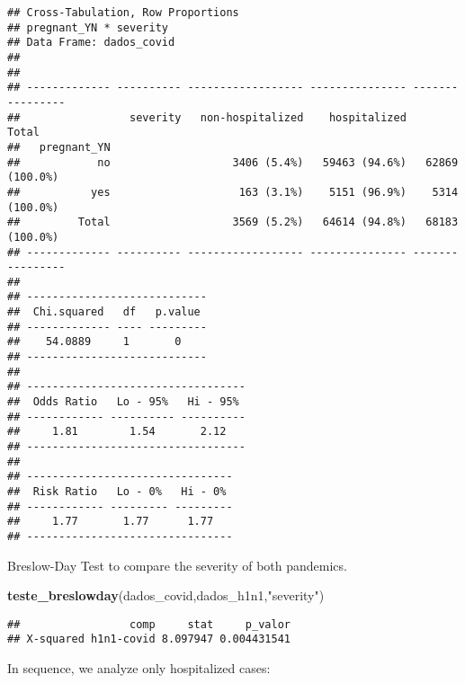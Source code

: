 \documentclass[
]{article}
\newenvironment{Shaded}{\begin{snugshade}}{\end{snugshade}}
\newcommand{\CommentTok}[1]{\textcolor[rgb]{0.56,0.35,0.01}{\textit{#1}}}
\newcommand{\KeywordTok}[1]{\textcolor[rgb]{0.13,0.29,0.53}{\textbf{#1}}}
\newcommand{\NormalTok}[1]{#1}
\newcommand{\OperatorTok}[1]{\textcolor[rgb]{0.81,0.36,0.00}{\textbf{#1}}}
\newcommand{\StringTok}[1]{\textcolor[rgb]{0.31,0.60,0.02}{#1}}
\begin{document}
\begin{verbatim}
## Cross-Tabulation, Row Proportions  
## pregnant_YN * severity  
## Data Frame: dados_covid  
## 
## 
## ------------- ---------- ------------------ --------------- ----------------
##                 severity   non-hospitalized    hospitalized            Total
##   pregnant_YN                                                               
##            no                   3406 (5.4%)   59463 (94.6%)   62869 (100.0%)
##           yes                    163 (3.1%)    5151 (96.9%)    5314 (100.0%)
##         Total                   3569 (5.2%)   64614 (94.8%)   68183 (100.0%)
## ------------- ---------- ------------------ --------------- ----------------
## 
## ----------------------------
##  Chi.squared   df   p.value 
## ------------- ---- ---------
##    54.0889     1       0    
## ----------------------------
## 
## ----------------------------------
##  Odds Ratio   Lo - 95%   Hi - 95% 
## ------------ ---------- ----------
##     1.81        1.54       2.12   
## ----------------------------------
## 
## --------------------------------
##  Risk Ratio   Lo - 0%   Hi - 0% 
## ------------ --------- ---------
##     1.77       1.77      1.77   
## --------------------------------
\end{verbatim}

Breslow-Day Test to compare the severity of both pandemics.

\begin{Shaded}
\begin{Highlighting}[]
\KeywordTok{teste_breslowday}\NormalTok{(dados_covid,dados_h1n1,}\StringTok{"severity"}\NormalTok{)}
\end{Highlighting}
\end{Shaded}

\begin{verbatim}
##                 comp     stat     p_valor
## X-squared h1n1-covid 8.097947 0.004431541
\end{verbatim}

In sequence, we analyze only hospitalized cases:

\begin{Shaded}
\end{Shaded}
\end{document}
